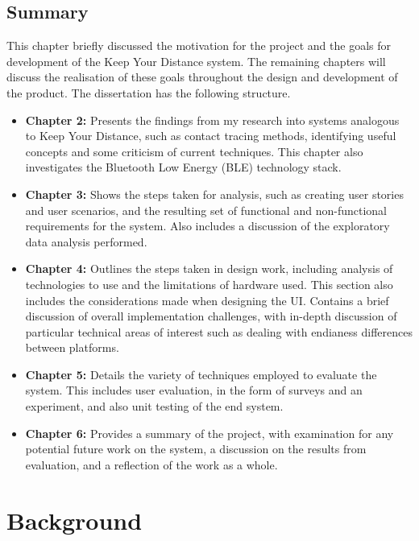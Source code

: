 \documentclass{l4proj}
\begin{document}
\section{Summary}
This chapter briefly discussed the motivation for the project and the goals for development of the Keep Your Distance system. The remaining chapters will discuss the realisation of these goals throughout the design and development of the product. The dissertation has the following structure.
\begin{itemize}
    \item \textbf{Chapter 2:} Presents the findings from my research into systems analogous to Keep Your Distance, such as contact tracing methods, identifying useful concepts and some criticism of current techniques. This chapter also investigates the Bluetooth Low Energy (BLE) technology stack.
    \item \textbf{Chapter 3:} Shows the steps taken for analysis, such as creating user stories and user scenarios, and the resulting set of functional and non-functional requirements for the system. Also includes a discussion of the exploratory data analysis performed.
    \item \textbf{Chapter 4:} Outlines the steps taken in design work, including analysis of technologies to use and the limitations of hardware used. This section also includes the considerations made when designing the UI. Contains a brief discussion of overall implementation challenges, with in-depth discussion of particular technical  areas of interest such as dealing with endianess differences between platforms.
    \item \textbf{Chapter 5:} Details the variety of techniques employed to evaluate the system. This includes user evaluation, in the form of surveys and an experiment, and also unit testing of the end system.
    \item \textbf{Chapter 6:} Provides a summary of the project, with examination for any potential future work on the system, a discussion on the results from evaluation, and a reflection of the work as a whole.
\end{itemize}



\chapter{Background}
\end{document}
